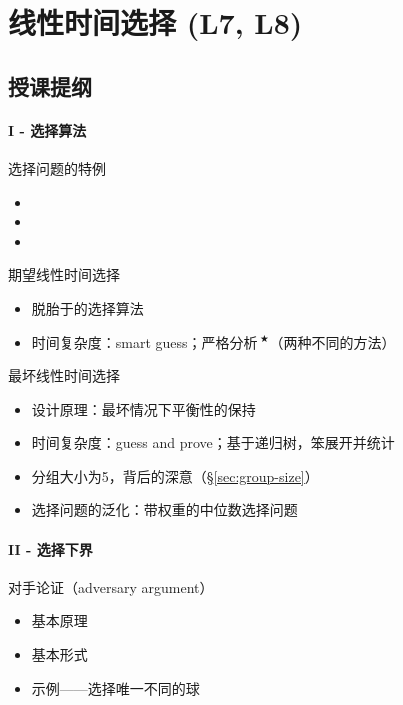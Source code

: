 \chapter{线性时间选择 (L7, L8)}

\section*{授课提纲}

\subsubsection{I - 选择算法}

\nid 选择问题的特例
\begin{itemize}
    \item {}
    \item {}
    \item {}
\end{itemize}

\nid 期望线性时间选择
\begin{itemize}
    \item 脱胎于的选择算法
    \item 时间复杂度：smart guess；严格分析$\,^\bigstar$（两种不同的方法）
\end{itemize}

\nid 最坏线性时间选择
\begin{itemize}
    \item 设计原理：最坏情况下平衡性的保持
    \item 时间复杂度：guess and prove；基于递归树，笨展开并统计
    \item 分组大小为5，背后的深意（\S\ref{sec:group-size}）
    \item 选择问题的泛化：带权重的中位数选择问题
\end{itemize}


\subsubsection{II - 选择下界}

\nid 对手论证（adversary argument）
\begin{itemize}
    \item 基本原理
    \item 基本形式
    \item 示例——选择唯一不同的球
\end{itemize}

